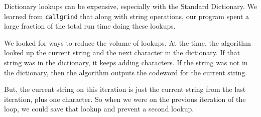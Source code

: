 \documentclass[12pt,twoside]{reedthesis}
\begin{document}
Dictionary lookups can be expensive, especially with the Standard Dictionary. We learned from \texttt{callgrind} that along with string operations, our program spent a large fraction of the total run time doing these lookups.

We looked for ways to reduce the volume of lookups. At the time, the algorithm looked up the current string and the next character in the dictionary. If that string was in the dictionary, it keeps adding characters. If the string was not in the dictionary, then the algorithm outputs the codeword for the current string.

But, the current string on this iteration is just the current string from the last iteration, plus one character. So when we were on the previous iteration of the loop, we could save that lookup and prevent a second lookup.
\end{document}
